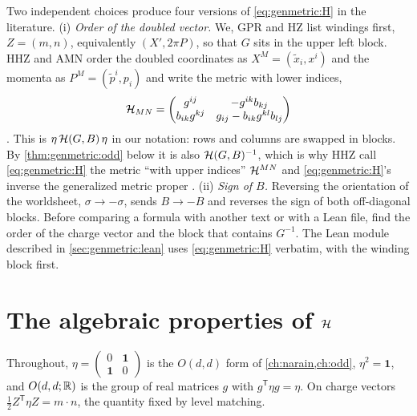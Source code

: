 \begin{pitfallbox}
Two independent choices produce four versions of \eqref{eq:genmetric:H} in the literature.
(i) \emph{Order of the doubled vector.} We, GPR and HZ list windings first, $Z=(m,n)$,
equivalently $(X',2\pi P)$, so that $G$ sits in the upper left block. HHZ and AMN order the
doubled coordinates as $X^M=(\tilde x_i,x^i)$ and the momenta as
$P^M=(\tilde p^i,p_i)$ and write the metric with lower indices,
\[
 \mathcal{H}_{MN}=\begin{pmatrix}g^{ij}&-g^{ik}b_{kj}\\ b_{ik}g^{kj}&g_{ij}-b_{ik}g^{kl}b_{lj}
 \end{pmatrix}
\]
. This is $\eta\,\mathcal{H}(G,B)\,\eta$ in our notation: rows and columns are
swapped in blocks. By \cref{thm:genmetric:odd} below it is also $\mathcal{H}(G,B)^{-1}$, which is
why HHZ call \eqref{eq:genmetric:H} the metric ``with upper indices'' $\mathcal{H}^{MN}$ and
\eqref{eq:genmetric:H}'s inverse the generalized metric proper
. (ii) \emph{Sign of $B$.} Reversing the
orientation of the worldsheet, $\sigma\to-\sigma$, sends $B\to-B$  and reverses the sign of both off-diagonal blocks. Before comparing a formula with
another text or with a Lean file, find the order of the charge vector and the block that
contains $G^{-1}$. The Lean module described in \cref{sec:genmetric:lean} uses
\eqref{eq:genmetric:H} verbatim, with the winding block first.
\end{pitfallbox}

\section{The algebraic properties of \texorpdfstring{$\mathcal{H}$}{H}}\label{sec:genmetric:properties}

Throughout, $\eta=\left(\begin{smallmatrix}0&\mathbf 1\\\mathbf 1&0\end{smallmatrix}\right)$
is the $O(d,d)$ form of \cref{ch:narain,ch:odd}, $\eta^2=\mathbf 1$, and $O(d,d;\mathbb{R})$ is the
group of real matrices $g$ with $g^{\mathsf T}\eta g=\eta$. On charge vectors
$\tfrac12Z^{\mathsf T}\eta Z=m\cdot n$, the quantity fixed by level matching.

